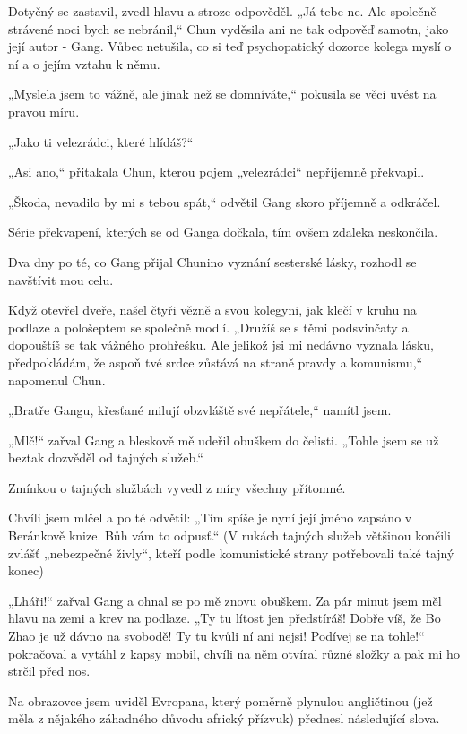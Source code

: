Dotyčný se zastavil, zvedl hlavu a stroze odpověděl. „Já tebe ne. Ale společně strávené noci bych se nebránil,“ Chun vyděsila ani ne tak odpověď samotn, jako její autor - Gang. Vůbec netušila, co si teď psychopatický dozorce kolega myslí o ní a o jejím vztahu k němu.

„Myslela jsem to vážně, ale jinak než se domníváte,“ pokusila se věci uvést na pravou míru.

„Jako ti velezrádci, které hlídáš?“

„Asi ano,“ přitakala Chun, kterou pojem „velezrádci“ nepříjemně překvapil.

„Škoda, nevadilo by mi s tebou spát,“ odvětil Gang skoro příjemně a odkráčel.

Série překvapení, kterých se od Ganga dočkala, tím ovšem zdaleka neskončila.

Dva dny po té, co Gang přijal Chunino vyznání sesterské lásky, rozhodl se navštívit mou celu.

Když otevřel dveře, našel čtyři vězně a svou kolegyni, jak klečí v kruhu na podlaze a pološeptem se společně modlí. „Družíš se s těmi podsvinčaty a dopouštíš se tak vážného prohřešku. Ale jelikož jsi mi nedávno vyznala lásku, předpokládám, že aspoň tvé srdce zůstává na straně pravdy a komunismu,“ napomenul Chun.

„Bratře Gangu, křesťané milují obzvláště své nepřátele,“ namítl jsem.

„Mlč!“ zařval Gang a bleskově mě udeřil obuškem do čelisti. „Tohle jsem se už beztak dozvěděl od tajných služeb.“

Zmínkou o tajných službách vyvedl z míry všechny přítomné.

Chvíli jsem mlčel a po té odvětil: „Tím spíše je nyní její jméno zapsáno v Beránkově knize. Bůh vám to odpusť.“ (V rukách tajných služeb většinou končili zvlášť „nebezpečné živly“, kteří podle komunistické strany potřebovali také tajný konec)

„Lháři!“ zařval Gang a ohnal se po mě znovu obuškem. Za pár minut jsem měl hlavu na zemi a krev na podlaze. „Ty tu lítost jen předstíráš! Dobře víš, že Bo Zhao je už dávno na svobodě! Ty tu kvůli ní ani nejsi! Podívej se na tohle!“ pokračoval a vytáhl z kapsy mobil, chvíli na něm otvíral různé složky a pak mi ho strčil před nos. 

Na obrazovce jsem uviděl Evropana, který poměrně plynulou angličtinou (jež měla z nějakého záhadného důvodu africký přízvuk) přednesl následující slova.

